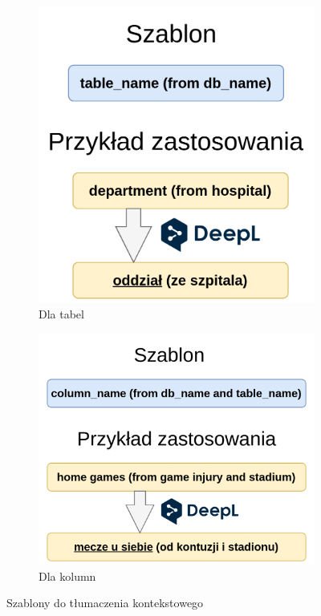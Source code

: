 \begin{figure}[ht!]
\centering
\begin{subfigure}{0.4\textwidth}
    \includegraphics[width=\textwidth]{images/translation_in_context_table.png}
    \caption{Dla tabel}
    \label{fig:first}
\end{subfigure}
\hfill
\begin{subfigure}{0.50\textwidth}
    \includegraphics[width=\textwidth]{images/translation_in_context_column.png}
    \caption{Dla kolumn}
    \label{fig:second}
\end{subfigure}
\caption{Szablony do tłumaczenia kontekstowego}
\label{fig:translation-in-context}
\end{figure}

